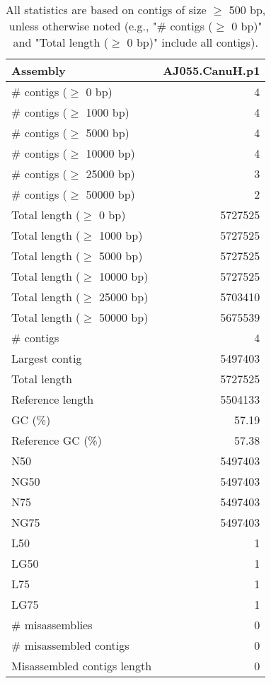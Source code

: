 \documentclass[12pt,a4paper]{article}
\begin{document}
\begin{table}[ht]
\begin{center}
\caption{All statistics are based on contigs of size $\geq$ 500 bp, unless otherwise noted (e.g., "\# contigs ($\geq$ 0 bp)" and "Total length ($\geq$ 0 bp)" include all contigs).}
\begin{tabular}{|l*{1}{|r}|}
\hline
Assembly & AJ055.CanuH.p1 \\ \hline
\# contigs ($\geq$ 0 bp) & 4 \\ \hline
\# contigs ($\geq$ 1000 bp) & 4 \\ \hline
\# contigs ($\geq$ 5000 bp) & 4 \\ \hline
\# contigs ($\geq$ 10000 bp) & 4 \\ \hline
\# contigs ($\geq$ 25000 bp) & 3 \\ \hline
\# contigs ($\geq$ 50000 bp) & 2 \\ \hline
Total length ($\geq$ 0 bp) & 5727525 \\ \hline
Total length ($\geq$ 1000 bp) & 5727525 \\ \hline
Total length ($\geq$ 5000 bp) & 5727525 \\ \hline
Total length ($\geq$ 10000 bp) & 5727525 \\ \hline
Total length ($\geq$ 25000 bp) & 5703410 \\ \hline
Total length ($\geq$ 50000 bp) & 5675539 \\ \hline
\# contigs & 4 \\ \hline
Largest contig & 5497403 \\ \hline
Total length & 5727525 \\ \hline
Reference length & 5504133 \\ \hline
GC (\%) & 57.19 \\ \hline
Reference GC (\%) & 57.38 \\ \hline
N50 & 5497403 \\ \hline
NG50 & 5497403 \\ \hline
N75 & 5497403 \\ \hline
NG75 & 5497403 \\ \hline
L50 & 1 \\ \hline
LG50 & 1 \\ \hline
L75 & 1 \\ \hline
LG75 & 1 \\ \hline
\# misassemblies & 0 \\ \hline
\# misassembled contigs & 0 \\ \hline
Misassembled contigs length & 0 \\ \hline

\end{tabular}
\end{center}
\end{table}
\end{document}
